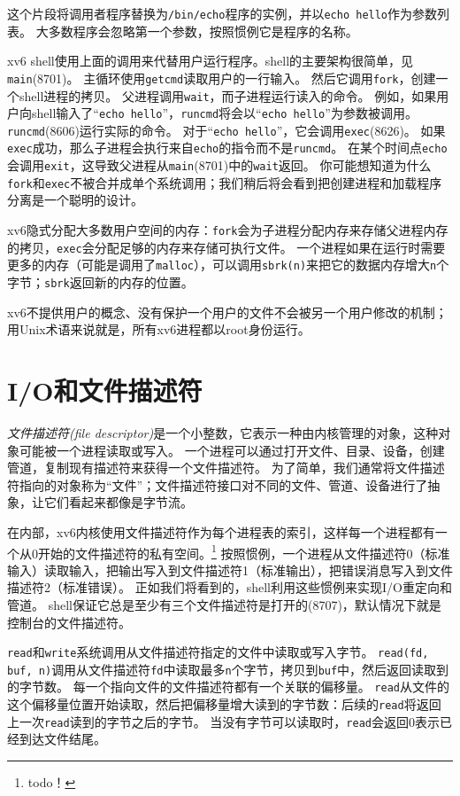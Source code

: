 这个片段将调用者程序替换为\texttt{/bin/echo}程序的实例，并以\texttt{echo hello}作为参数列表。
大多数程序会忽略第一个参数，按照惯例它是程序的名称。

xv6 shell使用上面的调用来代替用户运行程序。shell的主要架构很简单，见\texttt{main}(8701)。
主循环使用\texttt{getcmd}读取用户的一行输入。
然后它调用\texttt{fork}，创建一个shell进程的拷贝。
父进程调用\texttt{wait}，而子进程运行读入的命令。
例如，如果用户向shell输入了“\texttt{echo hello}”，\texttt{runcmd}将会以“\texttt{echo hello}”为参数被调用。
\texttt{runcmd}(8606)运行实际的命令。
对于“\texttt{echo hello}”，它会调用\texttt{exec}(8626)。
如果\texttt{exec}成功，那么子进程会执行来自\texttt{echo}的指令而不是\texttt{runcmd}。
在某个时间点\texttt{echo}会调用\texttt{exit}，这导致父进程从\texttt{main}(8701)中的\texttt{wait}返回。
你可能想知道为什么\texttt{fork}和\texttt{exec}不被合并成单个系统调用；我们稍后将会看到把创建进程和加载程序分离是一个聪明的设计。

xv6隐式分配大多数用户空间的内存：\texttt{fork}会为子进程分配内存来存储父进程内存的拷贝，\texttt{exec}会分配足够的内存来存储可执行文件。
一个进程如果在运行时需要更多的内存（可能是调用了\texttt{malloc}），可以调用\texttt{sbrk(n)}来把它的数据内存增大\texttt{n}个字节；\texttt{sbrk}返回新的内存的位置。

xv6不提供用户的概念、没有保护一个用户的文件不会被另一个用户修改的机制；用Unix术语来说就是，所有xv6进程都以root身份运行。

\section*{I/O和文件描述符}

\emph{文件描述符(file descriptor)}是一个小整数，它表示一种由内核管理的对象，这种对象可能被一个进程读取或写入。
一个进程可以通过打开文件、目录、设备，创建管道，复制现有描述符来获得一个文件描述符。
为了简单，我们通常将文件描述符指向的对象称为“文件”；文件描述符接口对不同的文件、管道、设备进行了抽象，让它们看起来都像是字节流。

在内部，xv6内核使用文件描述符作为每个进程表的索引，这样每一个进程都有一个从0开始的文件描述符的私有空间。\footnote{todo！}
按照惯例，一个进程从文件描述符0（标准输入）读取输入，把输出写入到文件描述符1（标准输出），把错误消息写入到文件描述符2（标准错误）。
正如我们将看到的，shell利用这些惯例来实现I/O重定向和管道。
shell保证它总是至少有三个文件描述符是打开的(8707)，默认情况下就是控制台的文件描述符。

\texttt{read}和\texttt{write}系统调用从文件描述符指定的文件中读取或写入字节。
\texttt{read(fd, buf, n)}调用从文件描述符\texttt{fd}中读取最多\texttt{n}个字节，拷贝到\texttt{buf}中，然后返回读取到的字节数。
每一个指向文件的文件描述符都有一个关联的偏移量。
\texttt{read}从文件的这个偏移量位置开始读取，然后把偏移量增大读到的字节数：后续的\texttt{read}将返回上一次\texttt{read}读到的字节之后的字节。
当没有字节可以读取时，\texttt{read}会返回0表示已经到达文件结尾。

